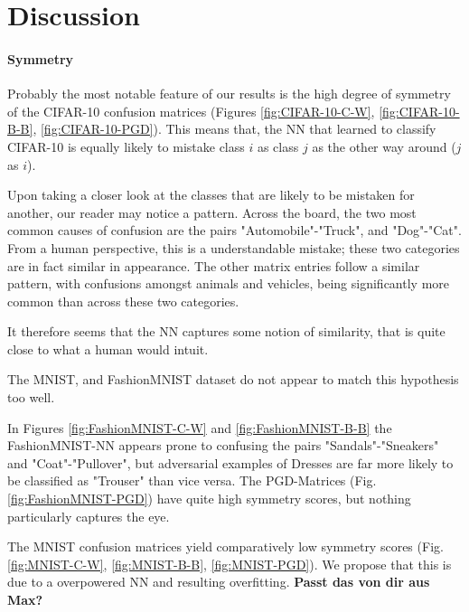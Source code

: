 \documentclass{article}
\begin{document}
\section{Discussion}

\paragraph{Symmetry}
Probably the most notable feature of our results is the high degree of symmetry of the CIFAR-10 confusion matrices (Figures \ref{fig:CIFAR-10-C-W}, \ref{fig:CIFAR-10-B-B}, \ref{fig:CIFAR-10-PGD}). This means that, the NN that learned to classify CIFAR-10 is equally likely to mistake class $i$ as class $j$ as the other way around ($j$ as $i$).

Upon taking a closer look at the classes that are likely to be mistaken for another, our reader may notice a pattern. Across the board, the two most common causes of confusion are the pairs "Automobile"-"Truck", and "Dog"-"Cat". From a human perspective, this is a understandable mistake; these two categories are in fact similar in appearance. The other matrix entries follow a similar pattern, with confusions amongst animals and vehicles, being significantly more common than across these two categories.

It therefore seems that the NN captures some notion of similarity, that is quite close to what a human would intuit.
\vspace{12pt}


The MNIST, and FashionMNIST dataset do not appear to match this hypothesis too well. 

In Figures \ref{fig:FashionMNIST-C-W} and \ref{fig:FashionMNIST-B-B} the FashionMNIST-NN appears prone to confusing the pairs "Sandals"-"Sneakers" and "Coat"-"Pullover", but adversarial examples of Dresses are far more likely to be classified as "Trouser" than vice versa. The PGD-Matrices (Fig. \ref{fig:FashionMNIST-PGD}) have quite high symmetry scores, but nothing particularly captures the eye.

The MNIST confusion matrices yield comparatively low symmetry scores (Fig. \ref{fig:MNIST-C-W}, \ref{fig:MNIST-B-B}, \ref{fig:MNIST-PGD}). We propose that this is due to a overpowered NN and resulting overfitting. \textbf{Passt das von dir aus Max?}
\end{document}
